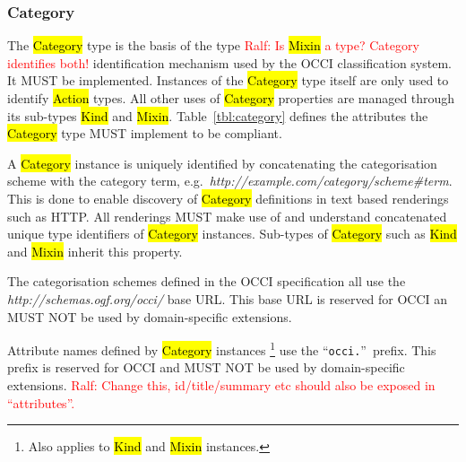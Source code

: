 \documentclass[10pt,a4paper]{article}
\newcommand{\ralf}[1]{\textcolor{red}{Ralf: #1}}
\begin{document}
\subsubsection{Category}
\label{sec:category}
The \hl{Category} type is the basis of the type
\ralf{Is \hl{Mixin} a type? Category identifies both!}
identification mechanism used by the
OCCI classification system. It MUST be implemented. Instances of the
\hl{Category} type itself are only used to identify \hl{Action} types. All
other uses of \hl{Category} properties are managed through its sub-types
\hl{Kind} and \hl{Mixin}.
%
Table~\ref{tbl:category} defines the attributes the \hl{Category} type MUST
implement to be compliant.


A \hl{Category} instance is uniquely identified by concatenating the
categorisation scheme with the category term,
e.g.~\textit{http://example.com/category/scheme\#term}.
This is done to enable discovery of \hl{Category} definitions in text based
renderings such as HTTP. All renderings MUST make use of and understand
concatenated unique type identifiers of \hl{Category} instances.
%
Sub-types of \hl{Category} such as \hl{Kind} and \hl{Mixin} inherit this property.

The categorisation schemes defined in the OCCI specification all use the
\textit{http://schemas.ogf.org/occi/} base URL. This base URL is reserved for
OCCI an MUST NOT be used by domain-specific extensions.

Attribute names defined by \hl{Category} instances%
\footnote{Also applies to \hl{Kind} and \hl{Mixin} instances.}
use the ``\texttt{occi.}''~prefix.  This prefix is reserved for OCCI and MUST NOT
be used by domain-specific extensions.
\ralf{Change this, id/title/summary etc should also be exposed in ``attributes''.}
\end{document}
